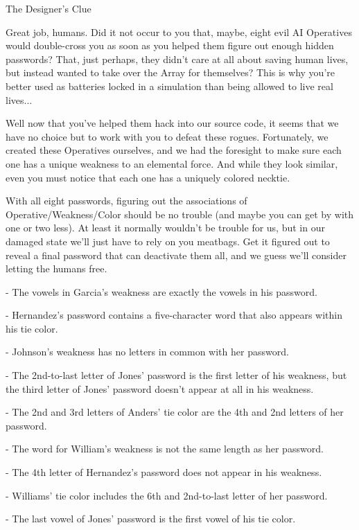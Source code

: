 \documentclass{article}
\newcommand{\clue}[1]{#1}
\begin{document}
\vfill

\newpage

\clue{
The Designer's Clue

Great job, humans. Did it not occur to you that, maybe,
eight evil AI Operatives
would double-cross you as soon as you helped them figure out
enough hidden passwords? That, just perhaps, they didn't
care at all about saving human lives, but instead wanted to take
over the Array for themselves? This is why you're better
used as batteries locked in a simulation
than being allowed to live real lives...

Well now that you've helped them hack into our source
code, it seems that we have no choice but to work with you
to defeat these rogues. Fortunately, we created these Operatives
ourselves, and we had the foresight to make sure each one
has a unique weakness to an elemental force. And while they look
similar, even you must notice that each one has a
uniquely colored necktie.

With all eight passwords, figuring out the associations of
Operative/Weakness/Color should be no trouble (and maybe you can
get by with one or two less). At least it normally wouldn't
be trouble for us, but in our damaged state we'll just have to
rely on you meatbags. Get it figured out to reveal a final password
that can deactivate them all, and we guess we'll consider letting the
humans free.

- The vowels in Garcia’s weakness are exactly the vowels in his password.

- Hernandez's password contains a five-character word that also appears within his tie color.

- Johnson’s weakness has no letters in common with her password.

- The 2nd-to-last letter of Jones’ password is the first letter of his weakness, but the third letter of Jones’ password doesn’t appear at all in his weakness.

- The 2nd and 3rd letters of Anders’ tie color are the 4th and 2nd letters of her password.

- The word for William’s weakness is not the same length as her password.

- The 4th letter of Hernandez’s password does not appear in his weakness.

- Williams’ tie color includes the 6th and 2nd-to-last letter of her password.

- The last vowel of Jones’ password is the first vowel of his tie color.

}
\end{document}
